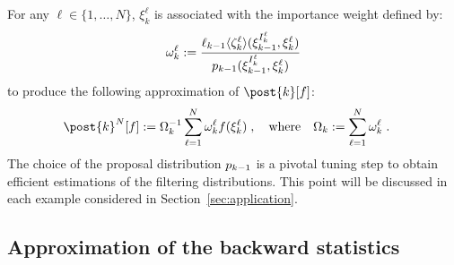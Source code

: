 \documentclass{article}
\newcommand{\N}{N}
\newcommand{\kissforward}[3][]
{\ifthenelse{\equal{#1}{}}{p_{#2}}
{\ifthenelse{\equal{#1}{fully}}{p^{\star}_{#2}}
{\ifthenelse{\equal{#1}{smooth}}{\tilde{r}_{#2}}{\mathrm{erreur}}}}}
\newcommand{\eqdef}{\ensuremath{:=}}
\newcommand{\eqsp}{\;}
\newcommand{\ewght}[2]{\ensuremath{\omega_{#1}^{#2}}}
\newcommand{\epart}[2]{\ensuremath{\xi_{#1}^{#2}}}
\newcommand{\sumwght}[2][]{%
\ifthenelse{\equal{#1}{}}{\ensuremath{\Omega_{#2}}}{\ensuremath{\Omega_{#2}^{(#1)}}}}
\newcommand{\hatqg}[1]{\mathsf{\ell}_{#1}}
\newcounter{example}[section]
\begin{document}
For any  $\ell \in\{1, \dots, \N\}$, $\epart{k}{\ell}$ is associated with the  importance weight defined by:
\begin{equation}
\label{eq:weight-update-filtering}
    \ewght{k}{\ell} \eqdef \frac{\hatqg{k-1}\langle\zeta_k^{\ell}\rangle(\epart{k-1}{I_k^{\ell}},\epart{k}{\ell}) }{ \kissforward{k-1}{k-1}(\epart{k-1}{I_k^{\ell}},\epart{k}{\ell})}
\end{equation}
to produce the following approximation of $\post{k}[f]$:
\begin{align*}
\post{k}^\N[f]&\eqdef \sumwght{k}^{-1}\sum_{\ell=1}^N \ewght{k}{\ell}f(\epart{k}{\ell})\eqsp,\quad\mbox{where}\quad\sumwght{k}\eqdef \sum_{\ell=1}^\N \ewght{k}{\ell}\eqsp.
\end{align*}
The choice of the proposal distribution $\kissforward{k-1}{k-1}$ is a pivotal tuning step to obtain efficient estimations of the filtering distributions.  This point will be discussed in each example considered in Section~\ref{sec:application}.



\subsection{Approximation of the backward statistics}
\label{sec:smoothing}
\end{document}
